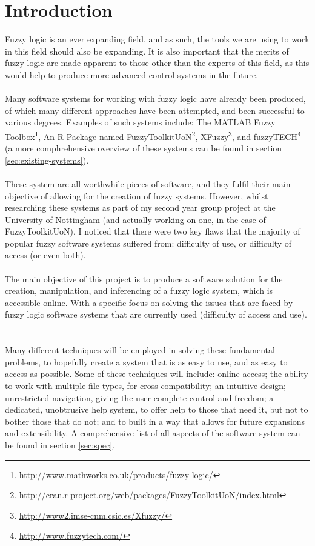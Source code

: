 \section{Introduction}
Fuzzy logic is an ever expanding field, and as such, the tools we are using to work in this field should also be expanding. It is also important that the merits of fuzzy logic are made apparent to those other than the experts of this field, as this would help to produce more advanced control systems in the future.\ \\
\ \\
Many software systems for working with fuzzy logic have already been produced, of which many different approaches have been attempted, and been successful to various degrees. Examples of such systems include: The MATLAB Fuzzy Toolbox\footnote{\url{http://www.mathworks.co.uk/products/fuzzy-logic/}}, An R Package named  FuzzyToolkitUoN\footnote{\url{http://cran.r-project.org/web/packages/FuzzyToolkitUoN/index.html}}, XFuzzy\footnote{\url{http://www2.imse-cnm.csic.es/Xfuzzy/}}, and fuzzyTECH\footnote{\url{http://www.fuzzytech.com/}} (a more comphrehensive overview of these systems can be found in section \ref{sec:existing-systems}).\ \\
\ \\
These system are all worthwhile pieces of software, and they fulfil their main objective of allowing for the creation of fuzzy systems. However, whilst researching these systems as part of my second year group project at the University of Nottingham (and actually working on one, in the case of FuzzyToolkitUoN), I noticed that there were two key flaws that the majority of popular fuzzy software systems suffered from: difficulty of use, or difficulty of access (or even both). \ \\
\ \\
The main objective of this project is to produce a software solution for the creation, manipulation, and inferencing of a fuzzy logic system, which is accessible online. With a specific focus on solving the issues that are faced by fuzzy logic software systems that are currently used (difficulty of access and use). \ \\
\ \\
Many different techniques will be employed in solving these fundamental problems, to hopefully create a system that is as easy to use, and as easy to access as possible. Some of these techniques will include: online access; the ability to work with multiple file types, for cross compatibility; an intuitive design; unrestricted navigation, giving the user complete control and freedom; a dedicated, unobtrusive help system, to offer help to those that need it, but not to bother those that do not; and to built in a way that allows for future expansions and extensibility. A comprehensive list of all aspects of the software system can be found in section \ref{sec:spec}.\ \\
